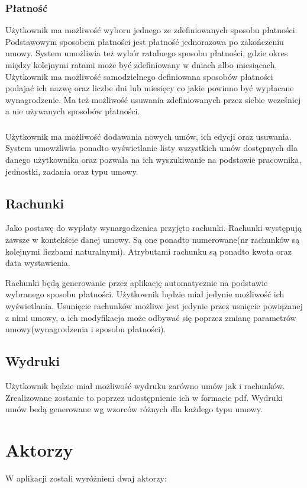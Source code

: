 \subsubsection{Płatność}
Użytkownik ma możliwość wyboru jednego ze zdefiniowanych sposobu płatności. Podstawowym sposobem płatności jest płatność jednorazowa po zakończeniu umowy. System umożliwia też wybór ratalnego sposobu płatności, gdzie okres między kolejnymi ratami może być zdefiniowany w dniach albo miesiącach. Użytkownik ma możliwość samodzielnego definiowana sposobów płatności podajać ich nazwę oraz liczbe dni lub miesięcy co jakie powinno być wypłacane wynagrodzenie. Ma też możliwość usuwania zdefiniowanych przez siebie wcześniej a nie używanych sposobów płatności. 

\subsubsection{}
Użytkownik ma możliwość dodawania nowych umów, ich edycji oraz usuwania. System umowżliwia ponadto wyświetlanie listy wszystkich umów dostępnych dla danego użytkownika oraz pozwala na ich wyszukiwanie na podstawie pracownika, jednostki, zadania oraz typu umowy.

\subsection[Rachunki][Rachunki]{Rachunki}
Jako postawę do wypłaty wynargodzeniea przyjęto rachunki. Rachunki występują zawsze w kontekście danej umowy. Są one ponadto numerowane(nr rachunków są kolejnymi liczbami naturalnymi). Atrybutami rachunku są ponadto kwota oraz data wystawienia.

Rachunki będą generowanie przez aplikację automatycznie na podstawie wybranego sposobu płatności. Użytkownik będzie miał jedynie możliwość ich wyświetlania. Usunięcie rachunków możliwe jest jedynie przez usnięcie powiązanej z nimi umowy, a ich modyfikacja może odbywać się poprzez zmianę parametrów umowy(wynagrodzenia i sposobu płatności).

\subsection[Wydruki][Wydruki]{Wydruki}
Użytkownik będzie miał możliwość wydruku zarówno umów jak i rachunków. Zrealizowane zostanie to poprzez udostępnienie ich w formacie pdf. Wydruki umów bedą generowane wg wzorców różnych dla każdego typu umowy.

\section[Aktorzy][Aktorzy]{Aktorzy}
W aplikacji zostali wyróżnieni dwaj aktorzy:

